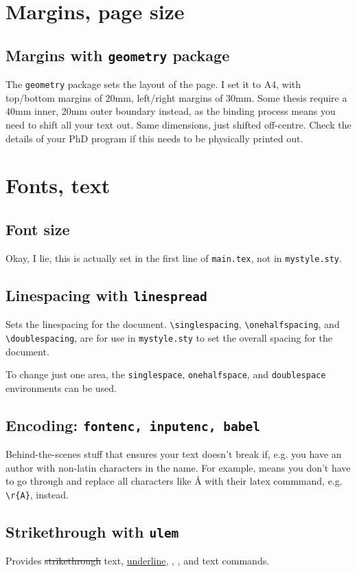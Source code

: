 \documentclass[../main]{subfiles}
\begin{document}
\section{Margins, page size}

\subsection{Margins with \texttt{geometry} package}
The \texttt{geometry} package sets the layout of the page. I set it to A4, with top/bottom margins of 20mm, left/right margins of 30mm. Some thesis require a 40mm inner, 20mm outer boundary instead, as the binding process means you need to shift all your text out. Same dimensions, just shifted off-centre. Check the details of your PhD program if this needs to be physically printed out.

\section{Fonts, text}

\subsection{Font size}
Okay, I lie, this is actually set in the first line of \texttt{main.tex}, not in \texttt{mystyle.sty}.

\subsection{Linespacing with \texttt{linespread}}
Sets the linespacing for the document. \verb|\singlespacing|, \verb|\onehalfspacing|, and \verb|\doublespacing|, are for use in \texttt{mystyle.sty} to set the overall spacing for the document.

To change just one area, the \texttt{singlespace}, \texttt{onehalfspace}, and \texttt{doublespace} environments can be used.

\subsection{Encoding: \texttt{fontenc, inputenc, babel}}
Behind-the-scenes stuff that ensures your text doesn't break if, e.g. you have an author with non-latin characters in the name. For example, means you don't have to go through and replace all characters like Å with their latex commmand, e.g. \verb|\r{A}|, instead.

\subsection{Strikethrough with \texttt{ulem}}
Provides \sout{strikethrough} text, \uline{underline}, , ,  and  text commands. 
\end{document}

